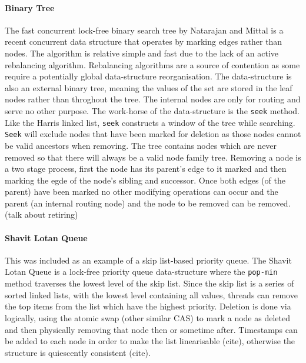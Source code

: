 \paragraph{Binary Tree} The fast concurrent lock-free binary search tree by Natarajan and Mittal is a recent concurrent data structure that operates by marking edges rather than nodes.\cite{LFBinaryTree} The algorithm is relative simple and fast due to the lack of an active rebalancing algorithm. Rebalancing algorithms are a source of contention as some require a potentially global data-structure reorganisation. The data-structure is also an external binary tree, meaning the values of the set are stored in the leaf nodes rather than throghout the tree. The internal nodes are only for routing and serve no other purpose. The work-horse of the data-structure is the \texttt{seek} method. Like the Harris linked list, \texttt{seek} constructs a window of the tree while searching. \texttt{Seek} will exclude nodes that have been marked for deletion as those nodes cannot be valid ancestors when removing. The tree contains nodes which are never removed so that there will always be a valid node family tree. Removing a node is a two stage process, first the node has its parent's edge to it marked and then marking the egde of the node's sibling and successor. Once both edges (of the parent) have been marked no other modifying operations can occur and the parent (an internal routing node) and the node to be removed can be removed. (talk about retiring)

\paragraph{Shavit Lotan Queue} This was included as an example of a skip list-based priority queue.\cite{ShavitLotanQueue} The Shavit Lotan Queue is a lock-free priority queue data-structure where the \texttt{pop-min} method traverses the lowest level of the skip list. Since the skip list is a series of sorted linked lists, with the lowest level containing all values, threads can remove the top items from the list which have the highest priority. Deletion is done via logically, using the atomic swap (other similar CAS) to mark a node as deleted and then physically removing that node then or sometime after. Timestamps can be added to each node in order to make the list linearisable (cite), otherwise the structure is quiescently consistent (cite).

